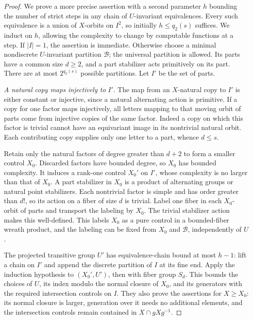 \begin{proof}
We prove a more precise assertion with a second parameter $h$ bounding
the number of strict steps in any chain of $U$-invariant equivalences.
Every such equivalence is a union of $X$-orbits on $I^2$, so initially
$h\le q_2(s)$ suffices.  We induct on $h$, allowing the complexity to
change by computable functions at a step.  If $|I|=1$, the assertion
is immediate.  Otherwise choose a minimal nondiscrete $U$-invariant
partition $\mathcal B$; the universal partition is allowed.  Its
parts have a common size $d\ge2$, and a part stabilizer acts
primitively on its part.  There are at most $2^{q_2(s)}$ possible
partitions.  Let $I'$ be the set of parts.

\emph{A natural copy maps injectively to $I'$.}
The map from an $X$-natural copy to $I'$ is either constant or
injective, since a natural alternating action is primitive.
If a copy for one factor maps injectively, all letters mapping to
that moving orbit of parts come from injective copies of the same
factor.  Indeed a copy on which this factor is trivial cannot have
an equivariant image in its nontrivial natural orbit.  Each
contributing copy supplies only one letter to a part, whence $d\le s$.

Retain only the natural factors of degree greater than $d+2$ to form
a smaller control $X_0$.  Discarded factors have bounded degree,
so $X_0$ has bounded complexity.  It induces a rank-one control
$X_0'$ on $I'$, whose complexity is no larger than that of $X_0$.
A part stabilizer in $X_0$ is a product of alternating
groups or natural point stabilizers.  Each nontrivial factor is
simple and has order greater than $d!$, so its action on a fiber of
size $d$ is trivial.  Label one fiber in each $X_0$-orbit of parts
and transport the labeling by $X_0$.  The trivial stabilizer action
makes this well-defined.  This labels $X_0$ as a pure control in a
bounded-fiber wreath product, and the labeling can be fixed from
$X_0$ and $\mathcal B$, independently of $U$.

The projected transitive group $U'$ has equivalence-chain bound at
most $h-1$: lift a chain on $I'$ and append the discrete partition
of $I$ at its fine end.  Apply the induction hypothesis to
$(X_0',U')$, then  with fiber group $S_d$.
This bounds the choices of $U$, its index modulo the normal closure
of $X_0$, and its generators with the required intersection controls
on $I$.  They also prove the assertions for $X\ge X_0$: its normal
closure is larger, generation over it needs no additional elements,
and the intersection controls remain contained in
$X\cap gXg^{-1}$.


\end{proof}
